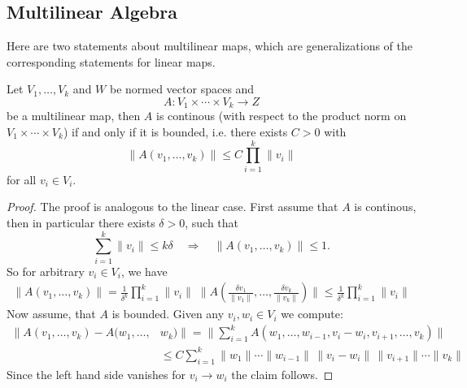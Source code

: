 \subsection{Multilinear Algebra}

Here are two statements about multilinear maps, which are generalizations of the corresponding statements for linear maps.

\begin{lemma}
    \label{lem:continuity_multilinear_maps}
    Let $V_1, \ldots, V_k$ and $W$ be normed vector spaces and 
    \[
    A \colon V_1 \times \cdots \times V_k \to Z
    \]
    be a multilinear map, then $A$ is continous (with respect to the product norm on $V_1 \times \cdots \times V_k$) if and only if it is bounded, i.e. there exists $C>0$ with
    \[
    \lVert A(v_1, \ldots, v_k) \rVert \leq C \prod_{i=1}^{k} \lVert v_i\rVert
    \]
    for all $v_i \in V_i$.
\end{lemma}
\begin{proof}
    The proof is analogous to the linear case. First assume that $A$ is continous, then in particular there exists $\delta >0$, such that 
    \[
    \sum_{i=1}^{k} \lVert v_i \rVert \leq k\delta \quad \Rightarrow \quad \lVert A(v_1, \ldots, v_k) \rVert \leq 1.
    \]
    So for arbitrary $v_i \in V_i$, we have
    \begin{align*}
        \lVert A(v_1, \ldots, v_k) \rVert = \frac{1}{\delta^k} \prod_{i=1}^{k} \lVert v_i\rVert \; \lVert A(\frac{\delta v_1}{\lVert v_1 \rVert}, \ldots, \frac{\delta v_k}{\lVert v_k \rVert}) \rVert \leq \frac{1}{\delta^k} \prod_{i=1}^{k} \lVert v_i\rVert
    \end{align*}
    Now assume, that $A$ is bounded. Given any $v_i,w_i \in V_i$ we compute:
    \begin{align*}
        \lVert A(v_1, \ldots, v_k) - A(w_1, \ldots, &w_k) \rVert  = \lVert \sum_{i=1}^{k} A(w_1,\ldots,w_{i-1}, v_i - w_i, v_{i+1},\ldots,v_k) \rVert \\ 
        &\leq C \sum_{i=1}^{k} \lVert w_1\rVert \cdots \lVert w_{i-1}\rVert \, \lVert v_i - w_i \rVert \, \lVert v_{i+1}\rVert \cdots \lVert v_k \rVert
    \end{align*}
    Since the left hand side vanishes for $v_i \to w_i$ the claim follows.
\end{proof}


